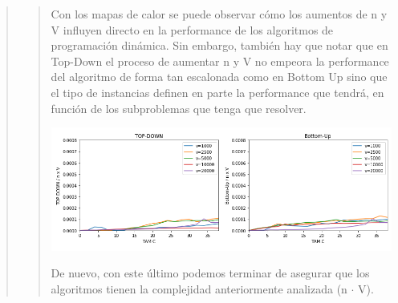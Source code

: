 \documentclass[8pt,a4paper]{article}
\begin{document}
\begin{verse}
\begin{verse}
\begin{center}
\end{center}
Con los mapas de calor se puede observar cómo los aumentos de n y V influyen directo en la performance de los algoritmos de programación dinámica. Sin embargo, también hay que notar que en Top-Down el proceso de aumentar n y V no empeora la performance del algoritmo de forma tan escalonada como en Bottom Up sino que el tipo de instancias definen en parte la performance que tendrá, en función de los subproblemas que tenga que resolver. 
\begin{center}
\includegraphics[scale=.8]{td_nxv.png}
\end{center}
De nuevo, con este último podemos terminar de asegurar que los algoritmos tienen la complejidad anteriormente analizada (n $\cdot$ V).
\end{verse}







\end{verse}
\end{document}
